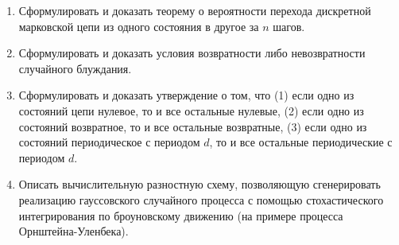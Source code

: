 \documentclass[a4paper,12pt]{extreport}
\renewcommand{\=}[1]{\stackrel{#1}{=}} %
\begin{document}
\begin{enumerate}

    \item Сформулировать и доказать теорему о вероятности перехода 
    дискретной марковской цепи из одного состояния в другое за $n$ шагов.


    \item Сформулировать и доказать условия возвратности либо
    невозвратности случайного блуждания.



    \item Сформулировать и доказать утверждение
    о том, что (1) если одно из состояний цепи нулевое, то и все остальные нулевые,
    (2) если одно из состояний возвратное, то и все остальные возвратные,
    (3) если одно из состояний периодическое с периодом $d$, то и все остальные
    периодические с периодом $d$.


    \item Описать вычислительную разностную схему, позволяющую
    сгенерировать реализацию гауссовского случайного процесса 
    с помощью стохастического интегрирования по броуновскому движению
    (на примере процесса Орнштейна-Уленбека).



\end{enumerate}
\end{document}
